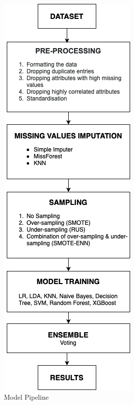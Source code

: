 \documentclass[11pt,a4paper]{article}
\begin{document}
\begin{figure}[H]
\centering
\includegraphics[width=.75\columnwidth]{Pipeline.png}
\caption{\label{fig::pipeline} Model Pipeline}
\end{figure}
\end{document}
